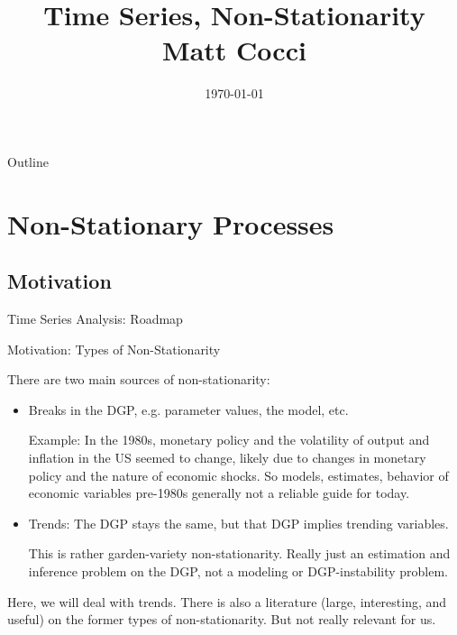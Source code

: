 \documentclass[aspectratio=169, handout]{beamer}
\title[]{Time Series, Non-Stationarity \\ Matt Cocci}
\author[]{}
\date{\today}
\begin{document}
\begin{frame}[plain]
\titlepage
\end{frame}


\begin{frame}{Outline}
\tableofcontents
\end{frame}


\section{Non-Stationary Processes}

\subsection{Motivation}

{\footnotesize
\begin{frame}{Time Series Analysis: Roadmap}
\end{frame}
}

{\footnotesize
\begin{frame}{Motivation: Types of Non-Stationarity}

There are two main sources of non-stationarity:
\begin{itemize}
  \item
    \alert{Breaks} in the \alert{DGP}, e.g. parameter values, the
    model, etc.

    \pause
    \alert{Example}: In the 1980s, monetary policy and the volatility of
    output and inflation in the US seemed to change, likely due to
    changes in monetary policy and the nature of economic shocks.
    So models, estimates, behavior of economic variables pre-1980s
    generally not a reliable guide for today.
\pause

  \item
    \alert{Trends}:
    The DGP stays the same, but that DGP implies trending variables.

    This is rather garden-variety non-stationarity.
    Really just an estimation and inference problem on the DGP, not a
    modeling or DGP-instability problem.
\end{itemize}
\pause
Here, we will deal with \alert{trends}.
There is also a literature (large, interesting, and useful) on the
former types of non-stationarity.
But not really relevant for us.
\end{frame}
}
\end{document}
